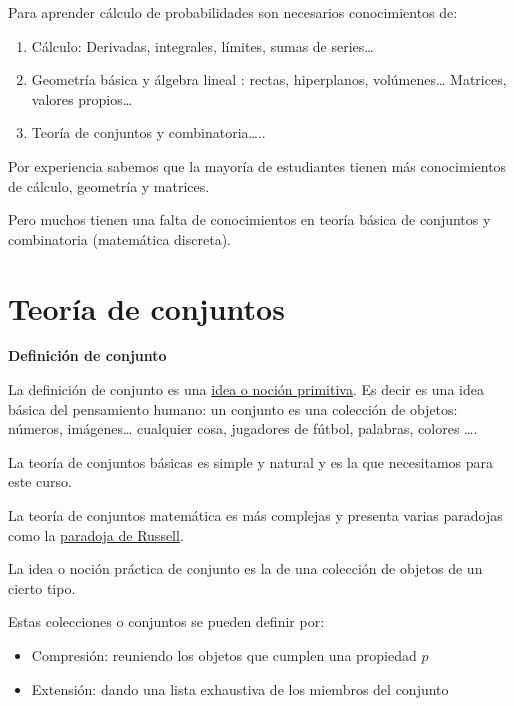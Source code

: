 \documentclass[]{book}
\providecommand{\tightlist}{%
  \setlength{\itemsep}{0pt}\setlength{\parskip}{0pt}}
\begin{document}
Para aprender cálculo de probabilidades son necesarios conocimientos de:

\begin{enumerate}
\def\labelenumi{\arabic{enumi}.}
\tightlist
\item
  Cálculo: Derivadas, integrales, límites, sumas de series\ldots{}
\item
  Geometría básica y álgebra lineal : rectas, hiperplanos, volúmenes\ldots{} Matrices, valores propios\ldots{}
\item
  Teoría de conjuntos y combinatoria\ldots{}..
\end{enumerate}

Por experiencia sabemos que la mayoría de estudiantes tienen más conocimientos de cálculo, geometría y matrices.

Pero muchos tienen una falta de conocimientos en teoría básica de conjuntos y combinatoria (matemática discreta).

\hypertarget{teoruxeda-de-conjuntos}{%
\section{Teoría de conjuntos}\label{teoruxeda-de-conjuntos}}

 \textbf{Definición de conjunto}

La definición de conjunto es una \href{https://es.wikipedia.org/wiki/Concepto_primitivo}{idea o noción primitiva}. Es decir es una idea básica del pensamiento humano: un conjunto es una colección de objetos: números, imágenes\ldots{} cualquier cosa, jugadores de fútbol, palabras, colores \ldots{}.

La teoría de conjuntos básicas es simple y natural y es la que necesitamos para este curso.

La teoría de conjuntos matemática es más complejas y presenta varias paradojas como la \href{https://es.wikipedia.org/wiki/Paradoja_de_Russell}{paradoja de Russell}.

La idea o noción práctica de conjunto es la de una colección de objetos de un cierto tipo.

Estas colecciones o conjuntos se pueden definir por:

\begin{itemize}
\tightlist
\item
  Compresión: reuniendo los objetos que cumplen una propiedad \(p\)
\item
  Extensión: dando una lista exhaustiva de los miembros del conjunto
\end{itemize}
\end{document}
